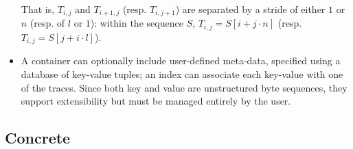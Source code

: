 \documentclass[10pt,a4paper]{llncs}
\begin{document}
\begin{itemize}
      \noindent
      That is, $T_{i,j}$ and $T_{i+1,j}$ (resp. $T_{i,j+1}$) are separated 
      by a stride of either $1$ or $n$ (resp. of $l$ or $1$): within the 
      sequence $S$, $T_{i,j} = S[ i + j \cdot n ]$ (resp. $T_{i,j} = S[ j 
      + i \cdot l ]$).
\item A container can optionally include user-defined meta-data, specified
      using a database of key-value tuples; an index can associate each 
      key-value with one of the traces.  Since both key and value are 
      unstructured byte sequences, they support extensibility but must be 
      managed entirely by the user.
\end{itemize}


\subsection{Concrete}
\end{document}
